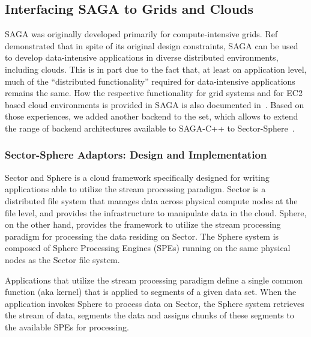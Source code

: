 \documentclass[3p,twocolumn]{elsarticle}
\begin{document}
\subsection{Interfacing SAGA to Grids and Clouds}

SAGA was originally developed primarily for compute-intensive grids.
Ref~\cite{saga_ccgrid09} demonstrated that in spite of its original
design constraints, SAGA can be used to develop data-intensive
applications in diverse distributed environments, including clouds.
This is in part due to the fact that, at least on application level,
much of the ``distributed functionality'' required for data-intensive
applications remains the same.  How the respective functionality for
grid systems and for EC2 based cloud environments is provided in SAGA
is also documented in~\cite{saga_ccgrid09}.  Based on those
experiences, we added another backend to the set, which allows to
extend the range of backend architectures available to SAGA-C++ to
Sector-Sphere~\cite{sectorsphere09}.



\subsubsection{Sector-Sphere Adaptors: Design and Implementation}

Sector and Sphere is a cloud framework specifically designed for
writing applications able to utilize the stream processing paradigm.
Sector is a distributed file system that manages data across physical
compute nodes at the file level, and provides the infrastructure to
manipulate data in the cloud.  Sphere, on the other hand, provides the
framework to utilize the stream processing paradigm for processing the
data residing on Sector.  The Sphere system is composed of Sphere
Processing Engines (SPEs) running on the same physical nodes as the
Sector file system.

Applications that utilize the stream processing paradigm define a
single common function (aka kernel) that is applied to segments of a
given data set.  When the application invokes Sphere to process data
on Sector, the Sphere system retrieves the stream of data, segments
the data and assigns chunks of these segments to the available SPEs
for processing.
\end{document}
